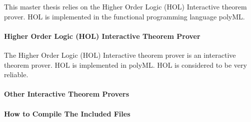 \documentclass[../../main/main.tex]{subfiles}
\begin{document}
This master thesis relies on the Higher Order Logic (HOL) Interactive theorem prover.  HOL is implemented in the functional programming language polyML.

\paragraph*{Higher Order Logic (HOL) Interactive Theorem Prover}


The Higher Order Logic (HOL) Interactive theorem prover is an interactive theorem prover.  HOL is implemented in polyML.  HOL is considered to be very reliable. 



\paragraph*{Other Interactive Theorem Provers}
\paragraph*{How to Compile The Included Files}
\end{document}
